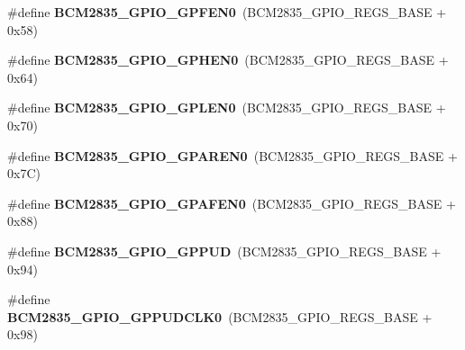 \begin{DoxyCompactItemize}
\item 
\mbox{\label{group__raspberrypi__reg_ga68dd53908fde07960921088e662e4b31}} 
\#define {\bfseries B\+C\+M2835\+\_\+\+G\+P\+I\+O\+\_\+\+G\+P\+F\+E\+N0}~(B\+C\+M2835\+\_\+\+G\+P\+I\+O\+\_\+\+R\+E\+G\+S\+\_\+\+B\+A\+SE + 0x58)
\item 
\mbox{\label{group__raspberrypi__reg_ga2515109205a26de8103603c7a2000483}} 
\#define {\bfseries B\+C\+M2835\+\_\+\+G\+P\+I\+O\+\_\+\+G\+P\+H\+E\+N0}~(B\+C\+M2835\+\_\+\+G\+P\+I\+O\+\_\+\+R\+E\+G\+S\+\_\+\+B\+A\+SE + 0x64)
\item 
\mbox{\label{group__raspberrypi__reg_ga5c110d419125f810b1e39a2b8903c69e}} 
\#define {\bfseries B\+C\+M2835\+\_\+\+G\+P\+I\+O\+\_\+\+G\+P\+L\+E\+N0}~(B\+C\+M2835\+\_\+\+G\+P\+I\+O\+\_\+\+R\+E\+G\+S\+\_\+\+B\+A\+SE + 0x70)
\item 
\mbox{\label{group__raspberrypi__reg_gac6ca3739fd30f51c4f86b2e2aa644e49}} 
\#define {\bfseries B\+C\+M2835\+\_\+\+G\+P\+I\+O\+\_\+\+G\+P\+A\+R\+E\+N0}~(B\+C\+M2835\+\_\+\+G\+P\+I\+O\+\_\+\+R\+E\+G\+S\+\_\+\+B\+A\+SE + 0x7\+C)
\item 
\mbox{\label{group__raspberrypi__reg_gab31a5445bbf440029609932662976c37}} 
\#define {\bfseries B\+C\+M2835\+\_\+\+G\+P\+I\+O\+\_\+\+G\+P\+A\+F\+E\+N0}~(B\+C\+M2835\+\_\+\+G\+P\+I\+O\+\_\+\+R\+E\+G\+S\+\_\+\+B\+A\+SE + 0x88)
\item 
\mbox{\label{group__raspberrypi__reg_gad0e9befeed9f1145b2694ba2b2444d69}} 
\#define {\bfseries B\+C\+M2835\+\_\+\+G\+P\+I\+O\+\_\+\+G\+P\+P\+UD}~(B\+C\+M2835\+\_\+\+G\+P\+I\+O\+\_\+\+R\+E\+G\+S\+\_\+\+B\+A\+SE + 0x94)
\item 
\mbox{\label{group__raspberrypi__reg_ga5eb68a06ee48677273ef5fa814439b46}} 
\#define {\bfseries B\+C\+M2835\+\_\+\+G\+P\+I\+O\+\_\+\+G\+P\+P\+U\+D\+C\+L\+K0}~(B\+C\+M2835\+\_\+\+G\+P\+I\+O\+\_\+\+R\+E\+G\+S\+\_\+\+B\+A\+SE + 0x98)
\end{DoxyCompactItemize}
